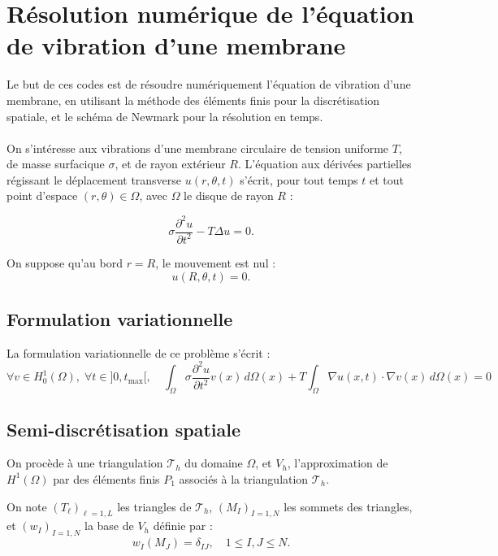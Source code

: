 \documentclass[a4paper,11pt]{article}
\begin{document}
	
	\section*{Résolution numérique de l'équation de vibration d'une membrane}
	
	Le but de ces codes est de résoudre numériquement l’équation de vibration d’une membrane, en utilisant la méthode des éléments finis pour la discrétisation spatiale, et le schéma de Newmark pour la résolution en temps.
	\\ \\
	On s’intéresse aux vibrations d’une membrane circulaire de tension uniforme \(T\), de masse surfacique \(\sigma\), et de rayon extérieur \(R\). L’équation aux dérivées partielles régissant le déplacement transverse \(u(r, \theta, t)\) s’écrit, pour tout temps \(t\) et tout point d’espace \((r, \theta) \in \Omega\), avec \(\Omega\) le disque de rayon \(R\) :
	
	\[
	\sigma \frac{\partial^2 u}{\partial t^2} - T \Delta u = 0.
	\]
	
	On suppose qu’au bord \(r = R\), le mouvement est nul : 
	\[
	u(R, \theta, t) = 0.
	\]
	
	\subsection*{Formulation variationnelle}
	
	La formulation variationnelle de ce problème s’écrit :
	\[
	 \forall v \in H^1_0(\Omega), \; \forall t \in ]0, t_{\text{max}}[, \quad \int_{\Omega} \sigma \frac{\partial^2 u}{\partial t^2} v(x) \, d\Omega(x) 
	+ T \int_{\Omega} \nabla u(x, t) \cdot \nabla v(x) \, d\Omega(x) = 0
	\]
	
	\subsection*{Semi-discrétisation spatiale}
	
	On procède à une triangulation \(\mathcal{T}_h\) du domaine \(\Omega\), et \(V_h\), l’approximation de \(H^1(\Omega)\) par des éléments finis \(P_1\) associés à la triangulation \(\mathcal{T}_h\). 
	
	On note \((T_\ell)_{\ell=1,L}\) les triangles de \(\mathcal{T}_h\), \((M_I)_{I=1,N}\) les sommets des triangles, et \((w_I)_{I=1,N}\) la base de \(V_h\) définie par :
	\[
	w_I(M_J) = \delta_{IJ}, \quad 1 \leq I, J \leq N.
	\]
	
\end{document}
